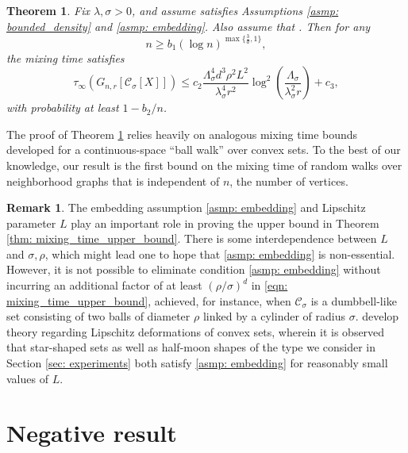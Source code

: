 \documentclass[11pt,twoside]{article}
\newtheorem{theorem}{Theorem}
\theoremstyle{definition}
\newtheorem{remark}{Remark}
\newcommand{\1}{\mathbbm{1}}
\newcommand{\Xbf}{X}
\newcommand{\Cbb}{\mathbb{C}}
\newcommand{\Cset}{\mathcal{C}}
\newcommand{\Csig}{\Cset_{\sigma}}
\begin{document}
\begin{theorem}
  \label{thm: mixing_time_upper_bound}
  Fix $\lambda, \sigma > 0$, and assume \smash{$\Cset \in \Cbb_f(\lambda)$} 
  satisfies Assumptions \ref{asmp: bounded_density} and \ref{asmp: embedding}.
  Also assume that . Then for any
  $$
  n \geq b_1 (\log n)^{\max\{\frac{3}{d},1\}},
  $$
  the mixing time satisfies
  \begin{equation} 
    \label{eqn: mixing_time_upper_bound}
    \tau_{\infty}(G_{n,r}[\Csig[\Xbf]]) \leq c_2 \frac{\Lambda_{\sigma}^4 d^3 
      \rho^2 L^2}{\lambda_{\sigma}^4 r^2} \log^2\left(\frac{
        \Lambda_{\sigma}}{\lambda_{\sigma}^2 r}\right) + c_3, 
  \end{equation}
  with probability at least $1 - b_2/n$.
\end{theorem}
The proof of Theorem \ref{thm: mixing_time_upper_bound} relies heavily on
analogous mixing time bounds developed for a continuous-space ``ball walk'' over
convex sets. To the best of our knowledge, our result is the first bound on the
mixing time of random walks over neighborhood graphs that is independent of $n$,
the number of vertices.    

\begin{remark}
  The embedding assumption \ref{asmp: embedding} and Lipschitz parameter $L$
  play an important role in proving the upper bound in Theorem \ref{thm:
    mixing_time_upper_bound}. There is some interdependence between $L$ and
  $\sigma,\rho$, which might lead one to hope that \ref{asmp: embedding} is
  non-essential. However, it is not possible to eliminate condition \ref{asmp:
    embedding} without incurring an additional factor of at least
  $(\rho/\sigma)^d$ in \eqref{eqn: mixing_time_upper_bound}, achieved, for
  instance, when $\Csig$ is a dumbbell-like set consisting of two balls of
  diameter $\rho$ linked by a cylinder of radius
  $\sigma$. \citet{abbasi-yadkori2016, abbasi-yadkori2016a}  
  develop theory regarding Lipschitz deformations of convex sets, wherein it
  is observed that star-shaped sets as well as half-moon shapes of the type we
  consider in Section \ref{sec: experiments} both satisfy \ref{asmp: embedding}
  for reasonably small values of $L$. 
\end{remark}

\section{Negative result}
\label{sec:lower_bound}
\end{document}
